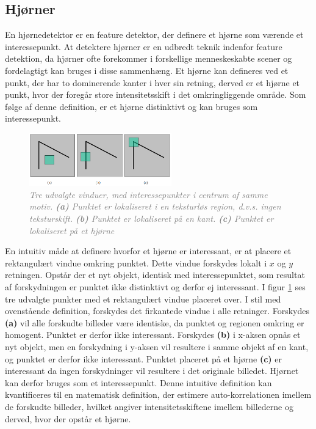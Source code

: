 \subsection{Hjørner}\label{subsec:corner}
En hjørnedetektor er en feature detektor, der definere et hjørne som værende et interessepunkt. At detektere hjørner er en udbredt teknik indenfor feature detektion, da hjørner ofte forekommer i forskellige menneskeskabte scener og fordelagtigt kan bruges i disse sammenhæng. Et hjørne kan defineres ved et punkt, der har to dominerende kanter i hver sin retning, derved er et hjørne et punkt, hvor der foregår store intensitetsskift i det omkringliggende område. Som følge af denne definition, er et hjørne distinktivt og kan bruges som interessepunkt.
\begin{figure}[H]
    \centering
    \includegraphics[width=0.55\textwidth]{fig/6.png}
    \vspace{-1em}   
    \begin{center}    
    \caption{\textcolor{gray}{\footnotesize \textit{
     Tre udvalgte vinduer, med interessepunkter i centrum af samme motiv. \textbf{(a)} Punktet er lokaliseret i en teksturløs region, d.v.s. ingen teksturskift. \textbf{(b)} Punktet er lokaliseret på en kant. \textbf{(c)} Punktet er lokaliseret på et hjørne }}}
    \label{fig:2}
     \end{center}
    \vspace{-2.7em}  
  \end{figure}  
\noindent
En intuitiv måde at definere hvorfor et hjørne er interessant, er at placere et rektangulært vindue omkring punktet. Dette vindue forskydes lokalt i $x$ og $y$ retningen. Opstår der et nyt objekt, identisk med interessepunktet, som resultat af forskydningen er punktet ikke distinktivt og derfor ej interessant. I figur \ref{fig:2} ses tre udvalgte punkter med et rektangulært vindue placeret over. I stil med ovenstående definition, forskydes det firkantede vindue i alle retninger. Forskydes \textbf{(a)} vil alle forskudte billeder være identiske, da punktet og regionen omkring er homogent. Punktet er derfor ikke interessant. Forskydes \textbf{(b)} i x-aksen opnås et nyt objekt, men en forskydning i y-aksen vil resultere i samme objekt af en kant, og punktet er derfor ikke interessant. Punktet placeret på et hjørne \textbf{(c)} er interessant da ingen forskydninger vil resultere i det originale billedet. Hjørnet kan derfor bruges som et interessepunkt. Denne intuitive definition kan kvantificeres til en matematisk definition, der estimere auto-korrelationen imellem de forskudte billeder, hvilket angiver intensitetsskiftene imellem billederne og derved, hvor der opstår et hjørne. 